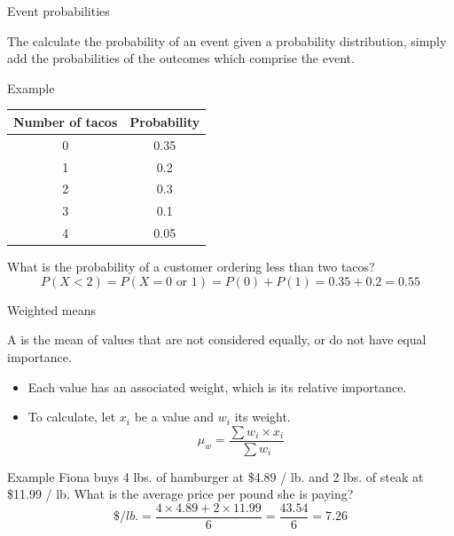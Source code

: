 \documentclass[xcolor=table, handout]{beamer}
\begin{document}
\begin{frame}{Event probabilities}
\begin{block}{}
The calculate the probability of an event given a probability distribution, simply add the probabilities of the outcomes which comprise the event.
\end{block}
\pause
\begin{exampleblock}{Example}
{\centering \renewcommand{\arraystretch}{1}
\begin{tabular}{c | c}
Number of tacos & Probability\\
\hline
0 & 0.35\\
1 & 0.2\\
2 & 0.3\\
3 & 0.1\\
4 & 0.05
\end{tabular}\par
\renewcommand{\arraystretch}{1.5}}
\bigskip
What is the probability of a customer ordering less than two tacos?
\pause\[P(X<2) = P(X = 0 \text{ or } 1) = P(0) + P(1) = 0.35 + 0.2 = 0.55 \]
\end{exampleblock}
\end{frame}

\begin{frame}{Weighted means}
\begin{block}{}
{\large A  is the mean of values that are not considered equally, or do not have equal importance.}
\begin{itemize}
\item Each value has an associated weight, which is its relative importance.
\item To calculate, let $x_i$ be a value and $w_i$ its weight.
\[\mu_w = \frac {\sum w_i \times x_i}{\sum w_i}\]
\end{itemize}
\end{block}
\pause
\begin{exampleblock}{Example}
Fiona buys 4 lbs. of hamburger at \$4.89 / lb. and 2 lbs. of steak at \$11.99 / lb. What is the average price per pound she is paying?
\[ \$/lb. = \frac {4 \times 4.89 + 2 \times 11.99}{6} = \frac {43.54}{6} = 7.26\]
\end{exampleblock}
\end{frame}
\end{document}
